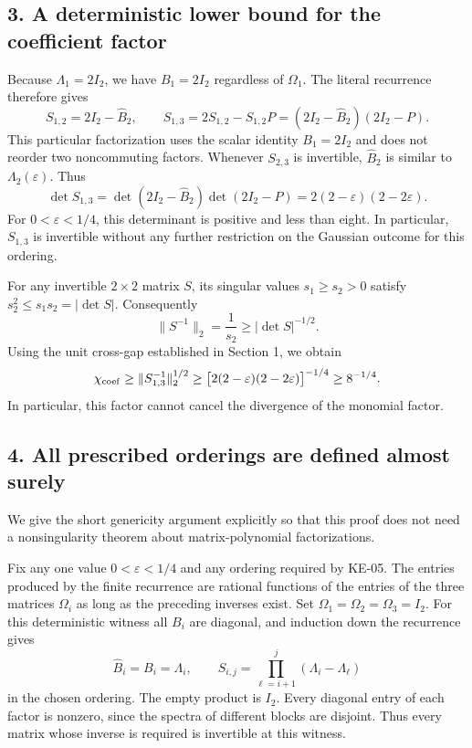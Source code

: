 \documentclass[10pt,a4paper]{article}
\begin{document}
\subsection{3. A deterministic lower bound for the coefficient factor}\label{a-deterministic-lower-bound-for-the-coefficient-factor}

Because \(\Lambda_1=2I_2\), we have \(B_1=2I_2\) regardless of \(\Omega_1\). The literal recurrence therefore gives \nopagebreak[3]
\[
S_{1,2}=2I_2-\widehat B_2,\qquad
S_{1,3}=2S_{1,2}-S_{1,2}P
       =(2I_2-\widehat B_2)(2I_2-P).
\] This particular factorization uses the scalar identity \(B_1=2I_2\) and does not reorder two noncommuting factors. Whenever \(S_{2,3}\) is invertible, \(\widehat B_2\) is similar to \(\Lambda_2(\varepsilon)\). Thus \nopagebreak[3]
\[
\det S_{1,3}
=\det(2I_2-\widehat B_2)\det(2I_2-P)
=2(2-\varepsilon)(2-2\varepsilon).
\] For \(0<\varepsilon<1/4\), this determinant is positive and less than eight. In particular, \(S_{1,3}\) is invertible without any further restriction on the Gaussian outcome for this ordering.

For any invertible \(2\times2\) matrix \(S\), its singular values \(s_1\geq s_2>0\) satisfy \(s_2^2\leq s_1s_2=|\det S|\). Consequently \nopagebreak[3]
\[
\|S^{-1}\|_2=\frac1{s_2}\geq|\det S|^{-1/2}.
\] Using the unit cross-gap established in Section 1, we obtain \nopagebreak[3]
\[
\chi_{\rm coef}
\geq\|S_{1,3}^{-1}\|_2^{1/2}
\geq\bigl[2(2-\varepsilon)(2-2\varepsilon)\bigr]^{-1/4}
\geq8^{-1/4}.
\] In particular, this factor cannot cancel the divergence of the monomial factor.

\subsection{4. All prescribed orderings are defined almost surely}\label{all-prescribed-orderings-are-defined-almost-surely}

We give the short genericity argument explicitly so that this proof does not need a nonsingularity theorem about matrix-polynomial factorizations.

Fix any one value \(0<\varepsilon<1/4\) and any ordering required by KE-05. The entries produced by the finite recurrence are rational functions of the entries of the three matrices \(\Omega_i\) as long as the preceding inverses exist. Set \(\Omega_1=\Omega_2=\Omega_3=I_2\). For this deterministic witness all \(B_i\) are diagonal, and induction down the recurrence gives \nopagebreak[3]
\[
\widehat B_i=B_i=\Lambda_i,\qquad
S_{i,j}=\prod_{\ell=i+1}^{j}(\Lambda_i-\Lambda_\ell)
\] in the chosen ordering. The empty product is \(I_2\). Every diagonal entry of each factor is nonzero, since the spectra of different blocks are disjoint. Thus every matrix whose inverse is required is invertible at this witness.
\end{document}
